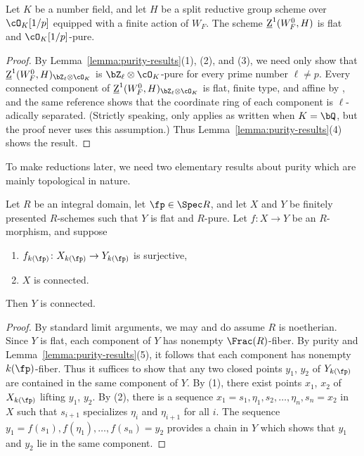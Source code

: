 \begin{lemma}\label{lemma:cocycles-pure}
    Let $K$ be a number field, and let $H$ be a split reductive group scheme over $\cO_K[1/p]$ equipped with a finite action of $W_F$. The scheme $\underline{\rm{Z}}^1(W_F^0, H)$ is flat and $\cO_K[1/p]$-pure.
\end{lemma}

\begin{proof}
    By Lemma~\ref{lemma:purity-results}(1), (2), and (3), we need only show that $\underline{\rm{Z}}^1(W_F^0, H)_{\bZ_\ell \otimes \cO_K}$ is $\bZ_\ell \otimes \cO_K$-pure for every prime number $\ell \neq p$. Every connected component of $\underline{\rm{Z}}^1(W_F^0, H)_{\bZ_\ell \otimes \cO_K}$ is flat, finite type, and affine by \cite[4.1]{DHKM}, and the same reference shows that the coordinate ring of each component is $\ell$-adically separated. (Strictly speaking, \cite[4.1]{DHKM} only applies as written when $K = \bQ$, but the proof never uses this assumption.) Thus Lemma~\ref{lemma:purity-results}(4) shows the result.
\end{proof}

To make reductions later, we need two elementary results about purity which are mainly topological in nature.

\begin{lemma}\label{lemma:conn-passes-to-image}
    Let $R$ be an integral domain, let $\fp \in \Spec R$, and let $X$ and $Y$ be finitely presented $R$-schemes such that $Y$ is flat and $R$-pure. Let $f\colon X \to Y$ be an $R$-morphism, and suppose
    \begin{enumerate}
        \item $f_{k(\fp)}\colon X_{k(\fp)} \to Y_{k(\fp)}$ is surjective,
        \item $X$ is connected.
    \end{enumerate}
    Then $Y$ is connected.
\end{lemma}

\begin{proof}
    By standard limit arguments, we may and do assume $R$ is noetherian. Since $Y$ is flat, each component of $Y$ has nonempty $\Frac(R)$-fiber. By purity and Lemma~\ref{lemma:purity-results}(5), it follows that each component has nonempty $k(\fp)$-fiber. Thus it suffices to show that any two closed points $y_1$, $y_2$ of $Y_{k(\fp)}$ are contained in the same component of $Y$. By (1), there exist points $x_1$, $x_2$ of $X_{k(\fp)}$ lifting $y_1$, $y_2$. By (2), there is a sequence $x_1 = s_1, \eta_1, s_2, \dots, \eta_n, s_n = x_2$ in $X$ such that $s_{i+1}$ specializes $\eta_i$ and $\eta_{i+1}$ for all $i$. The sequence $y_1 = f(s_1), f(\eta_1), \dots, f(s_n) = y_2$ provides a chain in $Y$ which shows that $y_1$ and $y_2$ lie in the same component.
\end{proof}



